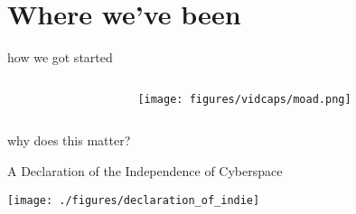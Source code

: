 \documentclass[presentation]{subfiles}
\begin{document}
\section{Where we've been}

\begin{frame}{how we got started}
    
    \begin{columns}
    \begin{column}{0.5\textwidth}



\vspace{1em}



\vspace{1em}

\end{column}


    \begin{column}{0.5\textwidth}
    
    \texttt{[image: figures/vidcaps/moad.png]}

    \end{column}
    \end{columns}

\end{frame}


\begin{frame}[standout]why does this matter?\end{frame}



\begin{frame}{A Declaration of the Independence of Cyberspace}
    
\texttt{[image: ./figures/declaration\_of\_indie]}

\end{frame}
\end{document}
